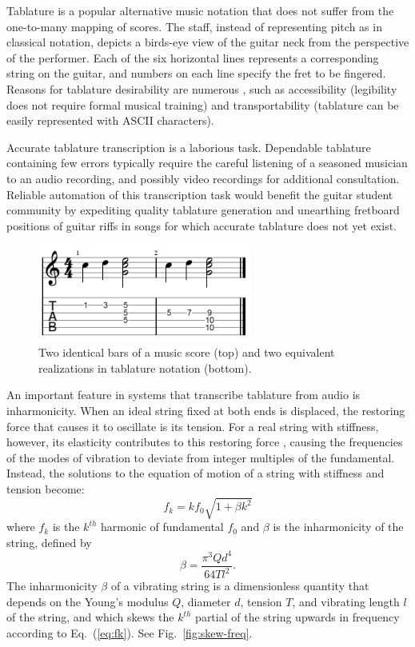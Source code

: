 \documentclass[convention,peer-reviewed]{aesconf}
\begin{document}
Tablature is a popular alternative music notation that does not suffer from the one-to-many mapping of scores. The staff, instead of representing pitch as in classical notation, depicts a birds-eye view of the guitar neck from the perspective of the performer. Each of the six horizontal lines represents a corresponding string on the guitar, and numbers on each line specify the fret to be fingered. Reasons for tablature desirability are numerous \citep{macrae2010}, such as accessibility (legibility does not require formal musical training) and transportability (tablature can be easily represented with ASCII characters). 

Accurate tablature transcription is a laborious task. Dependable tablature containing few errors typically require the careful listening of a seasoned musician to an audio recording, and possibly video recordings for additional consultation. Reliable automation of this transcription task would benefit the guitar student community by expediting quality tablature generation and unearthing fretboard positions of guitar riffs in songs for which accurate tablature does not yet exist.
\begin{figure}[!t] 
\centering
\includegraphics[width=70mm]{figs/score-tabs}
\caption{Two identical bars of a music score (top) and two equivalent realizations in tablature notation (bottom).}
\label{fig:score-tabs}
\end{figure}

An important feature in systems that transcribe tablature from audio is inharmonicity. When an ideal string fixed at both ends is displaced, the restoring force that causes it to oscillate is its tension. For a real string with stiffness, however, its elasticity contributes to this restoring force \citep{fletcher1962}, causing the frequencies of the modes of vibration to deviate from integer multiples of the fundamental. Instead, the solutions to the equation of motion of a string with stiffness and tension become: 
\begin{equation}
\label{eq:fk}
f_k = kf_{0}\sqrt{1+\beta k^2}
\end{equation}
where $f_k$ is the $k^{th}$ harmonic of fundamental $f_0$ and $\beta$ is the inharmonicity of the string, defined by
\begin{equation}
\beta = \frac{\pi^3 Q d^4}{64 T l^2}. \label{eq:beta}
\end{equation}
The inharmonicity $\beta$ of a vibrating string is a dimensionless quantity that depends on the Young's modulus $Q$, diameter $d$, tension $T$, and vibrating length $l$ of the string, and which skews the $k^{th}$ partial of the string upwards in frequency according to Eq.~(\ref{eq:fk}). See Fig.~\ref{fig:skew-freq}. 
\end{document}
